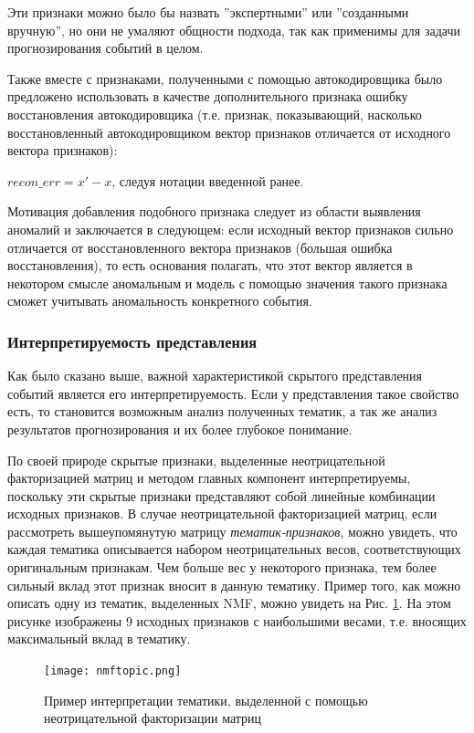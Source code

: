 Эти признаки можно было бы назвать ''экспертными'' или ''созданными вручную'', но они не умаляют общности подхода, так как применимы для задачи прогнозирования событий в целом.

Также вместе с признаками, полученными с помощью автокодировщика было предложено использовать в качестве дополнительного признака ошибку восстановления автокодировщика (т.е. признак, показывающий, насколько восстановленный автокодировщиком вектор признаков отличается от исходного вектора признаков):

$recon\_err = x' - x$, следуя нотации введенной ранее.

Мотивация добавления подобного признака следует из области выявления аномалий \cite{anomaly_detection_ae} и заключается в следующем: если исходный вектор признаков сильно отличается от восстановленного вектора признаков (большая ошибка восстановления), то есть основания полагать, что этот вектор является в некотором смысле аномальным и модель с помощью значения такого признака сможет учитывать аномальность конкретного события.

\subsubsection{Интерпретируемость представления}
\label{subsub:interp}
Как было сказано выше, важной характеристикой скрытого представления событий является его интерпретируемость. Если у представления такое свойство есть, то становится возможным анализ полученных тематик, а так же анализ результатов прогнозирования и их более глубокое понимание.

По своей природе скрытые признаки, выделенные неотрицательной факторизацией матриц и методом главных компонент интерпретируемы, поскольку эти скрытые признаки представляют собой линейные комбинации исходных признаков. В случае неотрицательной факторизацией матриц, если рассмотреть вышеупомянутую матрицу \textit{тематик-признаков}, можно увидеть, что каждая тематика описывается набором неотрицательных весов, соответствующих оригинальным признакам. Чем больше вес у некоторого признака, тем более сильный вклад этот признак вносит в данную тематику. 
Пример того, как можно описать одну из тематик, выделенных NMF, можно увидеть на Рис. \ref{fig:nmf_topic}. На этом рисунке изображены 9 исходных признаков с наибольшими весами, т.е. вносящих максимальный вклад в тематику.
\begin{figure}
  \centering
  \texttt{[image: nmftopic.png]}
  \caption{Пример интерпретации тематики, выделенной с помощью неотрицательной факторизации матриц}
  \label{fig:nmf_topic}
\end{figure}

